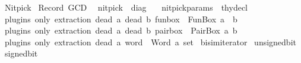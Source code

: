 %
\begin{isabellebody}%
%
%
\isadelimdocument
%
\endisadelimdocument
%
\isatagdocument
%
\isamarkuptrue%
%
\endisatagdocument
{\isafolddocument}%
%
\isadelimdocument
%
\endisadelimdocument
%
\isadelimtheory
%
\endisadelimtheory
%
\isatagtheory
{}\isamarkupfalse%
\ Nitpick\isanewline
{}\ Record\ GCD\isanewline
{}\isanewline
\ \ {\isachardoublequoteopen}nitpick{\isachardoublequoteclose}\ {\isacharcolon}{\kern0pt}{\isacharcolon}{\kern0pt}\ diag\ \isanewline
\ \ {\isachardoublequoteopen}nitpick{\isacharunderscore}{\kern0pt}params{\isachardoublequoteclose}\ {\isacharcolon}{\kern0pt}{\isacharcolon}{\kern0pt}\ thy{\isacharunderscore}{\kern0pt}decl\isanewline
{}%
\endisatagtheory
{\isafoldtheory}%
%
\isadelimtheory
\isanewline
%
\endisadelimtheory
\isanewline
{}\isamarkupfalse%
\ {\isacharparenleft}{\kern0pt}plugins\ only{\isacharcolon}{\kern0pt}\ extraction{\isacharparenright}{\kern0pt}\ {\isacharparenleft}{\kern0pt}dead\ {\isacharprime}{\kern0pt}a{\isacharcomma}{\kern0pt}\ dead\ {\isacharprime}{\kern0pt}b{\isacharparenright}{\kern0pt}\ fun{\isacharunderscore}{\kern0pt}box\ {\isacharequal}{\kern0pt}\ FunBox\ {\isachardoublequoteopen}{\isacharprime}{\kern0pt}a\ {\isasymRightarrow}\ {\isacharprime}{\kern0pt}b{\isachardoublequoteclose}\isanewline
{}\isamarkupfalse%
\ {\isacharparenleft}{\kern0pt}plugins\ only{\isacharcolon}{\kern0pt}\ extraction{\isacharparenright}{\kern0pt}\ {\isacharparenleft}{\kern0pt}dead\ {\isacharprime}{\kern0pt}a{\isacharcomma}{\kern0pt}\ dead\ {\isacharprime}{\kern0pt}b{\isacharparenright}{\kern0pt}\ pair{\isacharunderscore}{\kern0pt}box\ {\isacharequal}{\kern0pt}\ PairBox\ {\isacharprime}{\kern0pt}a\ {\isacharprime}{\kern0pt}b\isanewline
{}\isamarkupfalse%
\ {\isacharparenleft}{\kern0pt}plugins\ only{\isacharcolon}{\kern0pt}\ extraction{\isacharparenright}{\kern0pt}\ {\isacharparenleft}{\kern0pt}dead\ {\isacharprime}{\kern0pt}a{\isacharparenright}{\kern0pt}\ word\ {\isacharequal}{\kern0pt}\ Word\ {\isachardoublequoteopen}{\isacharprime}{\kern0pt}a\ set{\isachardoublequoteclose}\isanewline
\isanewline
{}\isamarkupfalse%
\ bisim{\isacharunderscore}{\kern0pt}iterator\isanewline
{}\isamarkupfalse%
\ unsigned{\isacharunderscore}{\kern0pt}bit\isanewline
{}\isamarkupfalse%
\ signed{\isacharunderscore}{\kern0pt}bit\isanewline

\end{isabellebody}
